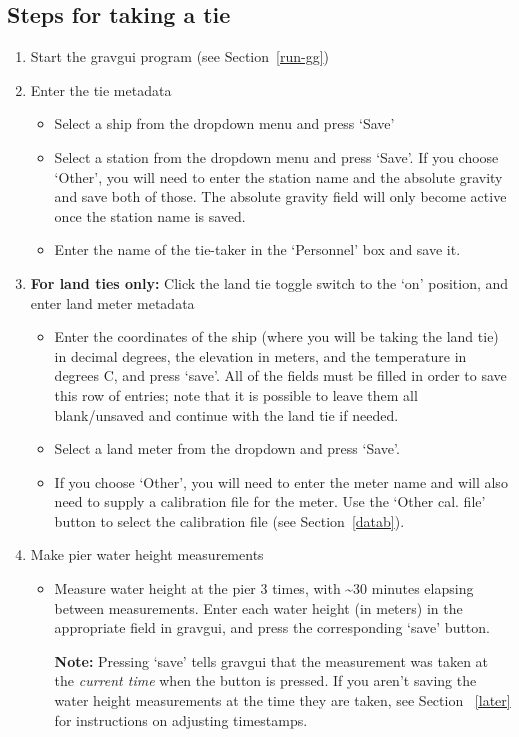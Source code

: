 \documentclass{pfpe-manual}
\begin{document}
\subsection{Steps for taking a tie}
\label{tie-instructions}
\begin{enumerate}
\item Start the gravgui program (see Section~\ref{run-gg})
\item Enter the tie metadata
    \begin{itemize}
    \item Select a ship from the dropdown menu and press `Save'
    \item Select a station from the dropdown menu and press `Save'. If you choose `Other', you will need to enter the station name and the absolute gravity and save both of those. The absolute gravity field will only become active once the station name is saved.
    \item Enter the name of the tie-taker in the `Personnel' box and save it.
    \end{itemize}
\item \textbf{For land ties only:} Click the land tie toggle switch to the `on' position, and enter land meter metadata
    \begin{itemize}
    \item Enter the coordinates of the ship (where you will be taking the land tie) in decimal degrees, the elevation in meters, and the temperature in degrees C, and press `save'. All of the fields must be filled in order to save this row of entries; note that it is possible to leave them all blank/unsaved and continue with the land tie if needed.
    \item Select a land meter from the dropdown and press `Save'. 
    \item If you choose `Other', you will need to enter the meter name and will also need to supply a calibration file for the meter. Use the `Other cal. file' button to select the calibration file (see Section~\ref{datab}).
    \end{itemize}
\item Make pier water height measurements
    \begin{itemize}
    \item Measure water height at the pier 3 times, with \textasciitilde 30 minutes elapsing between measurements. Enter each water height (in meters) in the appropriate field in gravgui, and press the corresponding `save' button. 
    \item[\textbf{Note:}] Pressing `save' tells gravgui that the measurement was taken at the \textit{current time} when the button is pressed. If you aren't saving the water height measurements at the time they are taken, see Section ~\ref{later} for instructions on adjusting timestamps.

\end{itemize}
\end{enumerate}
\end{document}
